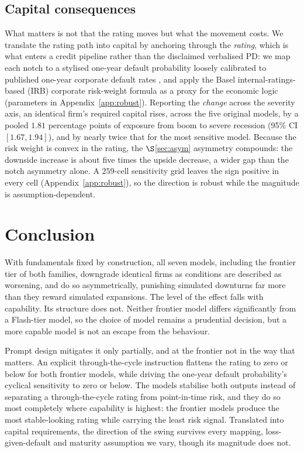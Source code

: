 \documentclass[a4paper,fleqn]{cas-sc}
\begin{document}
\subsection{Capital consequences}\label{sec:capital}
What matters is not that the rating moves but what the movement costs. We translate
the rating path into capital by anchoring through the \emph{rating}, which is what enters a credit pipeline rather than the disclaimed verbalised PD: we map each notch to a stylised one-year default
probability loosely calibrated to published one-year corporate default rates
\citep{spratings2025}, and apply the Basel
internal-ratings-based (IRB) corporate risk-weight formula \citep{bcbs_cre31} as a proxy for the
economic logic (parameters in Appendix~\ref{app:robust}). Reporting the \emph{change} across the severity axis,
an identical firm's required capital rises, across the five original models, by a pooled $1.81$ percentage points of exposure from
boom to severe recession (95\% CI $[1.67,1.94]$), and by nearly twice that for the most sensitive model.
Because the risk weight is convex in the rating, the $\S$\ref{sec:asym} asymmetry compounds: the downside
increase is about five times the upside decrease, a wider gap than the notch asymmetry alone. A
$259$-cell sensitivity grid leaves the sign positive in every cell (Appendix~\ref{app:robust}), so the
direction is robust while the magnitude is assumption-dependent.

\section{Conclusion}\label{sec:concl}
With fundamentals fixed by construction, all seven models, including the frontier tier of both families, downgrade identical firms as conditions are described as worsening, and do so
asymmetrically, punishing simulated downturns far more than they reward simulated expansions. The
level of the effect falls with capability. Its structure does not. Neither frontier model differs
significantly from a Flash-tier model, so the choice of model remains a prudential
decision, but a more capable model is not an escape from the behaviour.

Prompt design mitigates it only partially, and at the frontier not in the way that matters. An
explicit through-the-cycle instruction flattens the rating to zero or below for both frontier models, while
driving the one-year default probability's cyclical sensitivity to zero or below. The models stabilise
both outputs instead of separating a through-the-cycle rating from point-in-time risk, and they do so
most completely where capability is highest: the frontier models produce the most stable-looking rating
while carrying the least risk signal. Translated into capital requirements, the direction of the swing
survives every mapping, loss-given-default and maturity assumption we vary, though its magnitude does
not.
\end{document}
